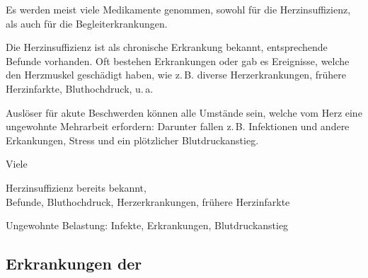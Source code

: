 \TextSlide
{{\TxSAMPLER}}
{
\begin{SAMPLERText}
  \item[\SAMPLER{S}] Es werden meist viele Medikamente genommen,
  sowohl für die Herzinsuffizienz, als auch für die
  Begleiterkrankungen.
  \item[\SAMPLER{P}] Die Herzinsuffizienz ist als chronische
  Erkrankung bekannt, entsprechende Befunde vorhanden. Oft
  bestehen Erkrankungen oder gab es Ereignisse, welche
  den Herzmuskel geschädigt haben, wie
  z.\,B. diverse Herzerkrankungen, frühere Herzinfarkte,
  Bluthochdruck, u.\,a.
  \item[\SAMPLER{R}] Auslöser für akute Beschwerden können alle
  Umstände sein, welche vom Herz eine ungewohnte Mehrarbeit
  erfordern: Darunter fallen z.\,B. Infektionen und andere
  Erkankungen, Stress und ein plötzlicher Blutdruckanstieg.
\end{SAMPLERText}
}
{
\begin{SAMPLERSlide}
  \item[\SAMPLER{S}] Viele
  \item[\SAMPLER{P}]  Herzinsuffizienz bereits bekannt,
  \\ Befunde, Bluthochdruck, Herzerkrankungen, frühere
  Herzinfarkte
  \item[\SAMPLER{R}] Ungewohnte Belastung: Infekte,
  Erkrankungen, Blutdruckanstieg
\end{SAMPLERSlide}
}
{}
{}
{}













\clearpage %

\subsection{Erkrankungen der }
\label{topic:khk}
\label{topic:aks}
\label{topic:acs}
\label{topic:akutes-koronarsyndrom}

